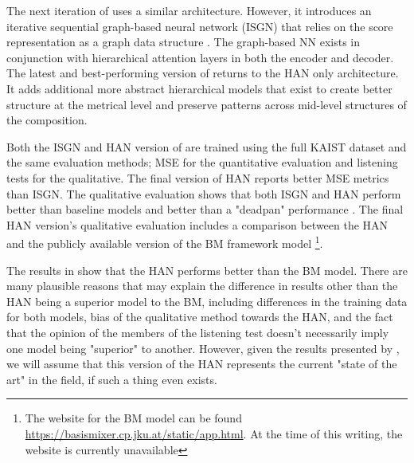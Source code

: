 The next iteration of \vnet{} uses a similar \ed{} architecture. However, it introduces an iterative sequential graph-based neural network (ISGN) that relies on the score representation as a graph data structure \cite{jeong2019graph}. The graph-based NN exists in conjunction with hierarchical attention layers in both the encoder and decoder. The latest and best-performing version of \vnet{}\cite{jeong2019virtuosonet} returns to the HAN only architecture. It adds additional more abstract hierarchical models that exist to create better structure at the metrical level and preserve patterns across mid-level structures of the composition. 

Both the ISGN\cite{jeong2019graph} and HAN\cite{jeong2019virtuosonet} version of \vnet{} are trained using the full KAIST dataset and the same evaluation methods; MSE for the quantitative evaluation and listening tests for the qualitative. The final version of HAN reports better MSE metrics than ISGN. The qualitative evaluation shows that both ISGN and HAN perform better than baseline models and better than a "deadpan" performance . The final HAN version's qualitative evaluation includes a comparison between the HAN and the publicly available version of the BM framework model \footnote{The website for the BM model can be found \href{here}{https://basismixer.cp.jku.at/static/app.html}. At the time of this writing, the website is currently unavailable}. 

The results in \cite{jeong2019virtuosonet} show that the HAN performs better than the BM model. There are many plausible reasons that may explain the difference in results other than the HAN being a superior model to the BM, including differences in the training data for both models, bias of the qualitative method towards the HAN, and the fact that the opinion of the members of the listening test doesn't necessarily imply one model being "superior" to another. However, given the results presented by \citet{jeong2019virtuosonet}, we will assume that this version of the HAN represents the current "state of the art" in the field, if such a thing even exists. 


